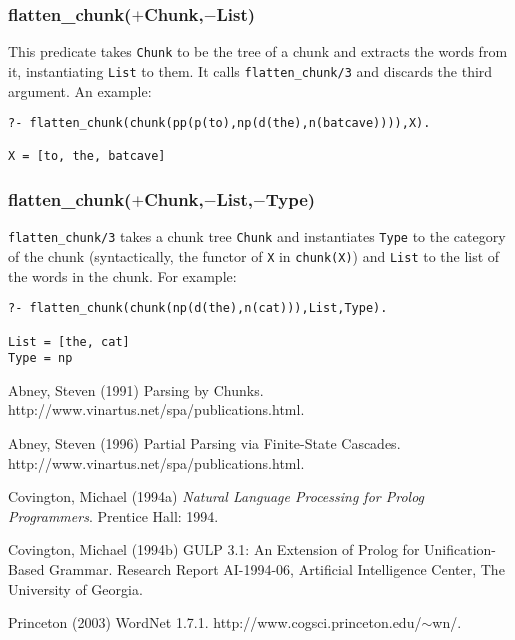 \documentclass[12pt]{article}
\begin{document}
\subsubsection*{flatten\_chunk($+$Chunk,$-$List)}

This predicate takes \verb+Chunk+ to be the tree of a chunk and extracts the words from it, instantiating \verb+List+ to them.  It calls \verb+flatten_chunk/3+ and discards the third argument.  An example:
\begin{verbatim}
?- flatten_chunk(chunk(pp(p(to),np(d(the),n(batcave)))),X).

X = [to, the, batcave] 
\end{verbatim}

\subsubsection*{flatten\_chunk($+$Chunk,$-$List,$-$Type)}

\verb+flatten_chunk/3+ takes a chunk tree \verb+Chunk+ and instantiates \verb+Type+ to the category of the chunk (syntactically, the functor of \verb+X+ in \verb+chunk(X)+) and \verb+List+ to the list of the words in the chunk.  For example:
\begin{verbatim}
?- flatten_chunk(chunk(np(d(the),n(cat))),List,Type).

List = [the, cat]
Type = np
\end{verbatim}

\begin{thebibliography}{}

\item{Abney, Steven (1991)}
Parsing by Chunks. \\
http://www.vinartus.net/spa/publications.html.

\item{Abney, Steven (1996)}
Partial Parsing via Finite-State Cascades. \\
http://www.vinartus.net/spa/publications.html.

\item{Covington, Michael (1994a)}
\emph{Natural Language Processing for Prolog Programmers}.
Prentice Hall: 1994.

\item{Covington, Michael (1994b)}
GULP 3.1:  An Extension of Prolog for Unification-Based Grammar.
Research Report AI-1994-06, Artificial Intelligence Center, The University of Georgia.

\item{Princeton (2003)}
WordNet 1.7.1.
http://www.cogsci.princeton.edu/$\sim$wn/.

\end{thebibliography}
\end{document}
